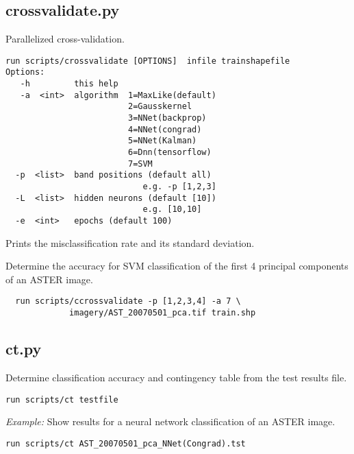 \documentclass{paper}
\begin{document}
\subsection*{crossvalidate.py}
Parallelized cross-validation.
\begin{verbatim}
run scripts/crossvalidate [OPTIONS]  infile trainshapefile
Options:
   -h         this help
   -a  <int>  algorithm  1=MaxLike(default)
                         2=Gausskernel
                         3=NNet(backprop)
                         4=NNet(congrad)
                         5=NNet(Kalman)
                         6=Dnn(tensorflow)
                         7=SVM
  -p  <list>  band positions (default all)
                            e.g. -p [1,2,3]
  -L  <list>  hidden neurons (default [10])
                            e.g. [10,10]
  -e  <int>   epochs (default 100)
\end{verbatim}
Prints the misclassification rate and its standard deviation.


 Determine the accuracy for SVM classification of the first 4 principal components of an ASTER image.
\begin{lstlisting}
  run scripts/ccrossvalidate -p [1,2,3,4] -a 7 \
             imagery/AST_20070501_pca.tif train.shp
\end{lstlisting}




\subsection*{ct.py}
Determine classification accuracy and contingency table from the test results file.
\begin{verbatim}
run scripts/ct testfile
\end{verbatim}
{\it Example:} Show results for a neural network classification of an ASTER image.
\begin{lstlisting}
run scripts/ct AST_20070501_pca_NNet(Congrad).tst
\end{lstlisting}
\end{document}
